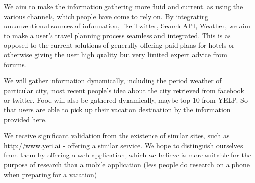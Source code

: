 We aim to make the information gathering more fluid and current, as using the various channels, which people have come to rely on. By integrating unconventional sources of information, like Twitter, Search API, Weather, we aim to make a user’s travel planning process seamless and integrated. This is as opposed to the current solutions of generally offering paid plans for hotels or otherwise giving the user high quality but very limited expert advice from forums.

We will gather information dynamically, including the period weather of particular city, most recent people's idea about the city retrieved from facebook or twitter. Food will also be gathered dynamically, maybe top 10 from YELP. So that users are able to pick up their vacation destination  by the information provided here. 

We receive significant validation from the existence of similar sites, such as \url{http://www.yeti.ai} - offering a similar service. We hope to distinguish ourselves from them by offering a web application, which we believe is more suitable for the purpose of research than a mobile application (less people do research on a phone when preparing for a vacation)
